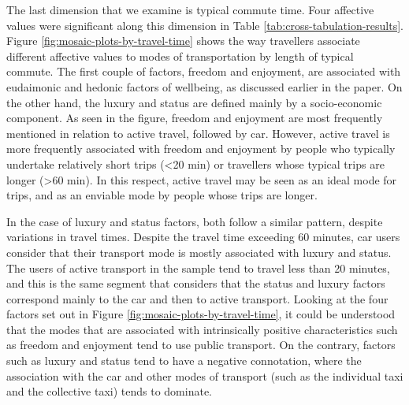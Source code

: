 \documentclass[]{elsarticle} %
\begin{document}
The last dimension that we examine is typical commute time. Four
affective values were significant along this dimension in Table
\ref{tab:cross-tabulation-results}. Figure
\ref{fig:mosaic-plots-by-travel-time} shows the way travellers associate
different affective values to modes of transportation by length of
typical commute. The first couple of factors, freedom and enjoyment, are
associated with eudaimonic and hedonic factors of wellbeing, as
discussed earlier in the paper. On the other hand, the luxury and status
are defined mainly by a socio-economic component. As seen in the figure,
freedom and enjoyment are most frequently mentioned in relation to
active travel, followed by car. However, active travel is more
frequently associated with freedom and enjoyment by people who typically
undertake relatively short trips (\textless20 min) or travellers whose
typical trips are longer (\textgreater60 min). In this respect, active
travel may be seen as an ideal mode for trips, and as an enviable mode
by people whose trips are longer.

In the case of luxury and status factors, both follow a similar pattern,
despite variations in travel times. Despite the travel time exceeding 60
minutes, car users consider that their transport mode is mostly
associated with luxury and status. The users of active transport in the
sample tend to travel less than 20 minutes, and this is the same segment
that considers that the status and luxury factors correspond mainly to
the car and then to active transport. Looking at the four factors set
out in Figure \ref{fig:mosaic-plots-by-travel-time}, it could be
understood that the modes that are associated with intrinsically
positive characteristics such as freedom and enjoyment tend to use
public transport. On the contrary, factors such as luxury and status
tend to have a negative connotation, where the association with the car
and other modes of transport (such as the individual taxi and the
collective taxi) tends to dominate.
\end{document}
